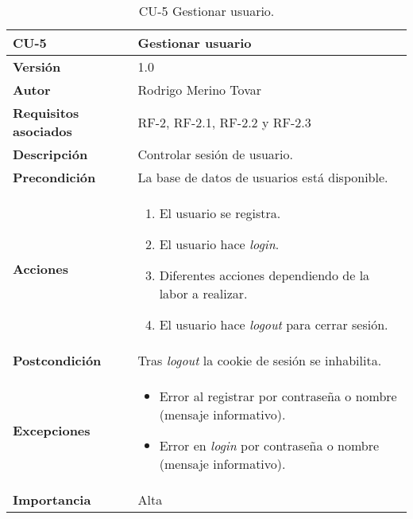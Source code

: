 \begin{table}[p]
	\centering
	\begin{tabularx}{\linewidth}{ p{} p{} }
		\toprule
		\textbf{CU-5}    & \textbf{Gestionar usuario}\\
		\toprule
		\textbf{Versión}              & 1.0    \\
		\textbf{Autor}                & Rodrigo Merino Tovar \\
		\textbf{Requisitos asociados} & RF-2, RF-2.1, RF-2.2 y RF-2.3 \\
		\textbf{Descripción}          & Controlar sesión de usuario.\\
		\textbf{Precondición}         & La base de datos de usuarios está disponible. \\
		\textbf{Acciones}             &
		\begin{enumerate}
			\def\labelenumi{\arabic{enumi}.}
			\tightlist
			\item El usuario se registra. 
			\item El usuario hace \emph{login}. 
			\item Diferentes acciones dependiendo de la labor a realizar.
			\item El usuario hace \emph{logout} para cerrar sesión.
		\end{enumerate}\\
		\textbf{Postcondición}        & Tras \emph{logout} la cookie de sesión se inhabilita. \\
		\textbf{Excepciones}          & 
		\begin{itemize}
			\tightlist
			\item Error al registrar por contraseña o nombre (mensaje informativo). 
			\item Error en \emph{login} por contraseña o nombre (mensaje informativo). 
		\end{itemize}\\
		\textbf{Importancia}          & Alta \\
		\bottomrule
	\end{tabularx}
	\caption{CU-5 Gestionar usuario.}
\end{table}


